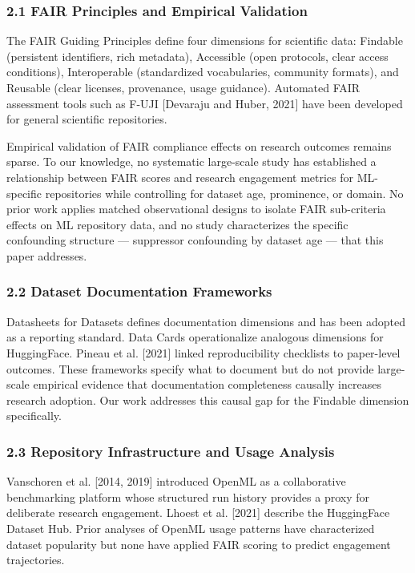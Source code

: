 
\subsubsection{2.1 FAIR Principles and Empirical Validation}

The FAIR Guiding Principles \citep{Wilkinsonetal2016} define four dimensions for scientific data: Findable (persistent identifiers, rich metadata), Accessible (open protocols, clear access conditions), Interoperable (standardized vocabularies, community formats), and Reusable (clear licenses, provenance, usage guidance). Automated FAIR assessment tools such as F-UJI [Devaraju and Huber, 2021] have been developed for general scientific repositories.

Empirical validation of FAIR compliance effects on research outcomes remains sparse. To our knowledge, no systematic large-scale study has established a relationship between FAIR scores and research engagement metrics for ML-specific repositories while controlling for dataset age, prominence, or domain. No prior work applies matched observational designs to isolate FAIR sub-criteria effects on ML repository data, and no study characterizes the specific confounding structure — suppressor confounding by dataset age — that this paper addresses.

\subsubsection{2.2 Dataset Documentation Frameworks}

Datasheets for Datasets \citep{Gebruetal2021} defines documentation dimensions and has been adopted as a reporting standard. Data Cards \citep{Pushkarnaetal2022} operationalize analogous dimensions for HuggingFace. Pineau et al. [2021] linked reproducibility checklists to paper-level outcomes. These frameworks specify what to document but do not provide large-scale empirical evidence that documentation completeness causally increases research adoption. Our work addresses this causal gap for the Findable dimension specifically.

\subsubsection{2.3 Repository Infrastructure and Usage Analysis}

Vanschoren et al. [2014, 2019] introduced OpenML as a collaborative benchmarking platform whose structured run history provides a proxy for deliberate research engagement. Lhoest et al. [2021] describe the HuggingFace Dataset Hub. Prior analyses of OpenML usage patterns have characterized dataset popularity but none have applied FAIR scoring to predict engagement trajectories.

